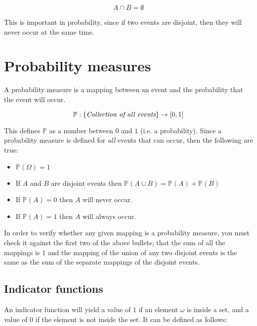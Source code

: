 \begin{dmath*}
	A \cap B = \emptyset
\end{dmath*}

This is important in probability, since if two events are disjoint, then they
will never occur at the same time.

\section{Probability measures}

A probability measure is a mapping between an event and the probability that the
event will occur.

\begin{dmath*}
	\mathbb{P} : \{\textrm{\it Collection of all events}\} \rightarrow [0,1]
\end{dmath*}

This defines $\mathbb{P}$ as a number between $0$ and $1$ (i.e. a probability).
Since a probability measure is defined for {\it all} events that can occur, then
the following are true:

\begin{itemize}
	\item $\mathbb{P}(\Omega) = 1$
	\item If $A$ and $B$ are disjoint events then $\mathbb{P}(A \cup B) = \mathbb{P}(A) + \mathbb{P}(B)$
	\item If $\mathbb{P}(A) = 0$ then $A$ will never occur.
	\item If $\mathbb{P}(A) = 1$ then $A$ will always occur.
\end{itemize}


In order to verify whether any given mapping is a probability measure, you must
check it against the first two of the above bullets; that the sum of all the
mappings is $1$ and the mapping of the union of any two disjoint events is the
same as the sum of the separate mappings of the disjoint events.

\subsection{Indicator functions}

An indicator function will yield a value of $1$ if an element $\omega$ is inside
a set, and a value of $0$ if the element is not inside the set. It can be
defined as follows:

